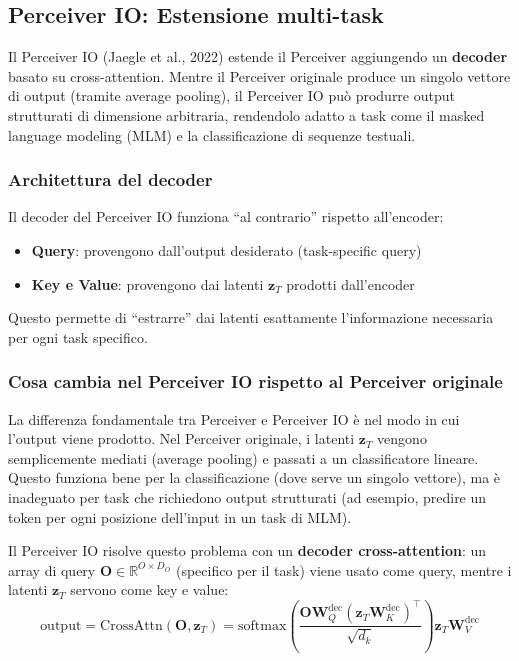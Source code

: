 \documentclass[12pt,a4paper]{article}
\begin{document}
\subsection{Perceiver IO: Estensione multi-task} \label{sec:exp_perceiver_io}

Il Perceiver IO (Jaegle et al., 2022) estende il Perceiver aggiungendo un \textbf{decoder} basato su cross-attention. Mentre il Perceiver originale produce un singolo vettore di output (tramite average pooling), il Perceiver IO pu\`o produrre output strutturati di dimensione arbitraria, rendendolo adatto a task come il masked language modeling (MLM) e la classificazione di sequenze testuali.

\subsubsection{Architettura del decoder}

Il decoder del Perceiver IO funziona ``al contrario'' rispetto all'encoder:
\begin{itemize}
    \item \textbf{Query}: provengono dall'output desiderato (task-specific query)
    \item \textbf{Key e Value}: provengono dai latenti $\mathbf{z}_T$ prodotti dall'encoder
\end{itemize}
Questo permette di ``estrarre'' dai latenti esattamente l'informazione necessaria per ogni task specifico.

\subsubsection{Cosa cambia nel Perceiver IO rispetto al Perceiver originale}

La differenza fondamentale tra Perceiver e Perceiver IO \`e nel modo in cui l'output viene prodotto. Nel Perceiver originale, i latenti $\mathbf{z}_T$ vengono semplicemente mediati (average pooling) e passati a un classificatore lineare. Questo funziona bene per la classificazione (dove serve un singolo vettore), ma \`e inadeguato per task che richiedono output strutturati (ad esempio, predire un token per ogni posizione dell'input in un task di MLM).

Il Perceiver IO risolve questo problema con un \textbf{decoder cross-attention}: un array di query $\mathbf{O} \in \mathbb{R}^{O \times D_O}$ (specifico per il task) viene usato come query, mentre i latenti $\mathbf{z}_T$ servono come key e value:
\[
\text{output} = \text{CrossAttn}(\mathbf{O}, \mathbf{z}_T) = \text{softmax}\!\left(\frac{\mathbf{O} \mathbf{W}_Q^{\text{dec}} (\mathbf{z}_T \mathbf{W}_K^{\text{dec}})^\top}{\sqrt{d_k}}\right) \mathbf{z}_T \mathbf{W}_V^{\text{dec}}
\]
\end{document}
